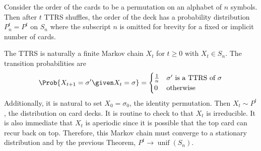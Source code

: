 \documentclass[12pt]{article}
\begin{document}
Consider the order of the cards to be a permutation on an alphabet of \(
n \) symbols.  Then after \( t \) TTRS shuffles, the order of the deck
has a probability distribution \( P^t_n = P^t \) on \( S_n \) where the
subscript \( n \) is omitted for brevity for a fixed or implicit number
of cards.

The TTRS is naturally a finite Markov chain \( X_t \) for \( t \ge 0 \)
with \( X_t \in S_n \).  The transition probabilities are
\[
    \Prob{X_{t+1} = \sigma' \given X_t = \sigma} =
    \begin{cases}
        \frac{1}{n}     & \text{\( \sigma' \) is a TTRS of \( \sigma \)}\\
        0       & \text{otherwise}
    \end{cases}
\] Additionally, it is natural to set \( X_0 = \sigma_0 \), the identity
permutation.  Then \( X_t \sim P^t \), the distribution on card decks.
It is routine to check to that \( X_t \) is irreducible.  It is also
immediate that \( X_t \) is aperiodic since it is possible that the top
card can recur back on top.  Therefore, this Markov chain must
converge to a stationary distribution and by the previous Theorem, \( P^t
\to
\operatorname{unif}
(S_n) \).
\end{document}
